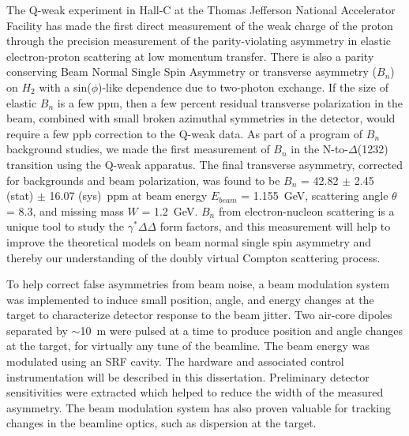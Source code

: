 
The Q-weak experiment in Hall-C at the Thomas Jefferson National Accelerator Facility has made the first direct measurement of the weak charge of the proton through the precision measurement of the parity-violating asymmetry in elastic electron-proton scattering at low momentum transfer. 
There is also a parity conserving Beam Normal Single Spin Asymmetry or transverse asymmetry ($B_{n}$) on $H_{2}$ with a sin($\phi$)-like dependence due to two-photon exchange. If the size of elastic $B_{n}$ is a few ppm, then a few percent residual transverse polarization in the beam, combined with small broken azimuthal symmetries in the detector, would require a few ppb correction to the Q-weak data. As part of a program of $B_{n}$ background studies, we made the first measurement of $B_{n}$ in the N-to-$\Delta$(1232) transition using the Q-weak apparatus. 
The final transverse asymmetry, corrected for backgrounds and beam polarization, was found to be $B_{n}$ = 42.82 $\pm$ 2.45 (stat) $\pm$ 16.07 (sys)~ppm at beam energy $E_{beam}$ = 1.155~GeV, scattering angle $\theta$ = 8.3\degrees{}, and missing mass $W$ = 1.2~GeV.
$B_{n}$ from electron-nucleon scattering is a unique tool to study the $\gamma^{*}\Delta\Delta$ form factors, and this measurement will help to improve the theoretical models on beam normal single spin asymmetry and thereby our understanding of the doubly virtual Compton scattering process.



To help correct false asymmetries from beam noise, a beam modulation system was implemented to induce small position, angle, and energy changes at the target to characterize detector response to the beam jitter.
Two air-core dipoles separated by $\sim$10~m were pulsed at a time to produce position and angle changes at the target, for virtually any tune of the beamline. The beam energy was modulated using an SRF cavity. 
The hardware and associated control instrumentation will be described in this dissertation. 
Preliminary detector sensitivities were extracted which helped to reduce the width of the measured asymmetry. The beam modulation system has also proven valuable for tracking changes in the beamline optics, such as dispersion at the target.

